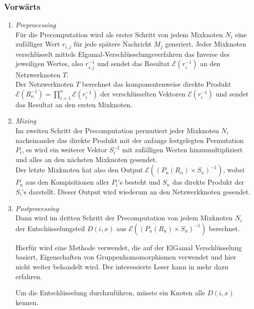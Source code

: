 \documentclass[
    fontsize=12pt,
    headings=small,
    parskip=half,           %
    bibliography=totoc,
    numbers=noenddot,       %
    open=any,               %
    final                   %
    ]{scrreprt}
\begin{document}
\subsubsection{Vorwärts}
\begin{enumerate}
	\item  \textit{Preprocessing} \\
	Für die Precomputation wird als erster Schritt von jedem Mixknoten $N_i$ eine zufälliger Wert $r_{i,j}$ für jede spätere Nachricht $M_j$ generiert.
Jeder Mixknoten verschlüsselt mittels Elgamal-Verschlüsselungsverfahren
das Inverse des jeweiligen Wertes, also \(r_{i,j}^{-1}\) und sendet das Resultat \(\mathcal{E} (r_i^{-1})\) an den Netzwerknoten $T$.\\
Der Netzwerknoten $T$ berechnet das komponentenweise direkte Produkt\\ \(\mathcal{E}( R_n^{-1})=\prod_{i=1}^n \mathcal{E} (r_i^{-1})\) der verschlüsselten Vektoren \(\mathcal{E} (r_i^{-1})\) und sendet das Resultat an den ersten Mixknoten.
	
	\item \textit{Mixing} \\
	Im zweiten Schritt der Precomputation permutiert jeder Mixknoten $N_i$ nacheinander das direkte Produkt mit der anfangs festgelegten Permutation $P_i$, es wird ein weiterer Vektor \(S_i^{-1} \) mit zufälligen Werten hinzumultipliziert und alles an den nächsten Mixknoten gesendet.\\
Der letzte Mixknoten hat also den Output \(\mathcal{E} ((P_n(R_n) \times S_n )^{-1})\),
wobei $P_n$ aus den Kompisitionen aller $P_i$'s besteht und $S_n$ das direkte Produkt der $S_i$'s darstellt.
Dieser Output wird wiederum an den Netzwerkknoten gesendet.

	\item \textit{Postprocessing} \\
	Dann wird im dritten Schritt der Precomputation von jedem Mixknoten $N_i$ 
der Entschüsselungsteil $D(i,x)$ aus \(\mathcal{E} ((P_n(R_n) \times S_n )^{-1})\) berechnet.

Hierfür wird eine Methode verwendet, die auf der ElGamal Verschlüsselung basiert,
Eigenschaften von Gruppenhomomorphismen verwendet und hier nicht weiter behandelt wird.
Der interessierte Leser kann in \cite{benaloh2006simple} mehr dazu erfahren.

Um die Entschlüsselung durchzuführen, müsste ein Knoten alle $D(i,x)$ kennen.
\end{enumerate}
\end{document}
